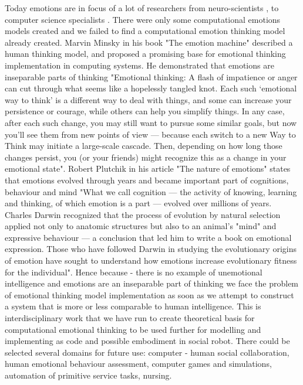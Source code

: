 Today emotions are in focus of a lot of researchers from neuro-scientists \cite{emotionsbraintorobot, parsingreward, neuromodulatory, cubeofemotions}, to computer science specialists \cite{emotionandsociable, senticcomputing, hourglass, affectivemodelofinterplay, affectivecomputing, affectivecomputingchallanges}.
There were only some computational emotions models created \cite{computationalmodelsemotion, computationalmodelsemotionscognition, evaluatingcomutationalmodel, threelevel} and we failed to find a computational emotion thinking model already created. Marvin Minsky in his book "The emotion machine" \cite{emotionmachine} described a human thinking model, and proposed a promising base for emotional thinking implementation in computing systems. He demonstrated that emotions are inseparable parts of thinking "Emotional thinking: A flash of impatience or anger can cut through what seems like a hopelessly tangled knot. Each such ‘emotional way to think' is a different way to deal with things, and some can increase your persistence or courage, while others can help you simplify things.
In any case, after each such change, you may still want to pursue some similar goals, but now you'll see them from new points of view — because each switch to a new Way to Think may initiate a large-scale cascade. Then, depending on how long those changes persist, you (or your friends) might recognize this as a change in your emotional state". Robert Plutchik in his article "The nature of emotions" \cite{natureofemotions} states that emotions evolved through years and became important part of cognitions, behaviour and mind "What we call cognition — the activity of knowing, learning and thinking, of which emotion is a part — evolved over millions of years. Charles Darwin recognized that the process of evolution by natural selection applied not only to anatomic structures but also to an animal's "mind" and expressive behaviour — a conclusion that led him to write a book on emotional expression. Those who have followed Darwin in studying the evolutionary origins of emotion have sought to understand how emotions increase evolutionary fitness for the individual". Hence because - there is no example of unemotional intelligence and emotions are an inseparable part of thinking we face the problem of emotional thinking model implementation as soon as we attempt to construct a system that is more or less comparable to human intelligence. This is interdisciplinary work that we have run to create theoretical basis for computational emotional thinking to be used further for modelling and implementing as code and possible embodiment in social robot. There could be selected several domains for future use: computer - human social collaboration, human emotional behaviour assessment, computer games and simulations, automation of primitive service tasks, nursing.


